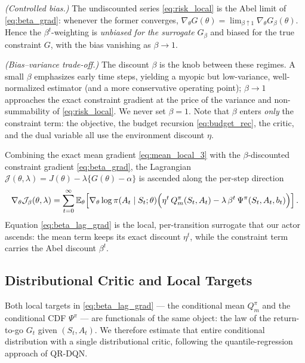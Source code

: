 \emph{(Controlled bias.)} The undiscounted series \eqref{eq:risk_local} is the Abel limit of \eqref{eq:beta_grad}: whenever the former converges, $\nabla_{\theta}G(\theta)=\lim_{\beta\uparrow1}\nabla_{\theta}G_{\beta}(\theta)$. Hence the $\beta^t$-weighting is \emph{unbiased for the surrogate} $G_{\beta}$ and biased for the true constraint $G$, with the bias vanishing as $\beta\to1$.

\emph{(Bias--variance trade-off.)} The discount $\beta$ is the knob between these regimes. A small $\beta$ emphasizes early time steps, yielding a myopic but low-variance, well-normalized estimator (and a more conservative operating point); $\beta\to1$ approaches the exact constraint gradient at the price of the variance and non-summability of \eqref{eq:risk_local}. We never set $\beta=1$. Note that $\beta$ enters \emph{only} the constraint term: the objective, the budget recursion \eqref{eq:budget_rec}, the critic, and the dual variable all use the environment discount $\eta$.

Combining the exact mean gradient \eqref{eq:mean_local_3} with the $\beta$-discounted constraint gradient \eqref{eq:beta_grad}, the Lagrangian $\mathcal{J}(\theta,\lambda)=J(\theta)-\lambda\{G(\theta)-\alpha\}$ is ascended along the per-step direction
\begin{align}\label{eq:beta_lag_grad}
    \nabla_{\theta}\mathcal{J}_{\beta}(\theta,\lambda)
    =
    \sum_{t=0}^{\infty}
    \mathbb{E}_{\theta}\!\left[
        \nabla_{\theta}\log\pi(A_t\mid S_t;\theta)
        \Bigl(
            \eta^t\,Q_m^{\pi}(S_t,A_t)
            -
            \lambda\,\beta^t\,\Psi^{\pi}(S_t,A_t,b_t)
        \Bigr)
    \right].
\end{align}
Equation \eqref{eq:beta_lag_grad} is the local, per-transition surrogate that our actor ascends: the mean term keeps its exact discount $\eta^t$, while the constraint term carries the Abel discount $\beta^t$.

\subsection{Distributional Critic and Local Targets}\label{sec:critic}
Both local targets in \eqref{eq:beta_lag_grad} --- the conditional mean $Q_m^{\pi}$ and the conditional CDF $\Psi^{\pi}$ --- are functionals of the same object: the law of the return-to-go $G_t$ given $(S_t,A_t)$. We therefore estimate that entire conditional distribution with a single distributional critic, following the quantile-regression approach of QR-DQN.

